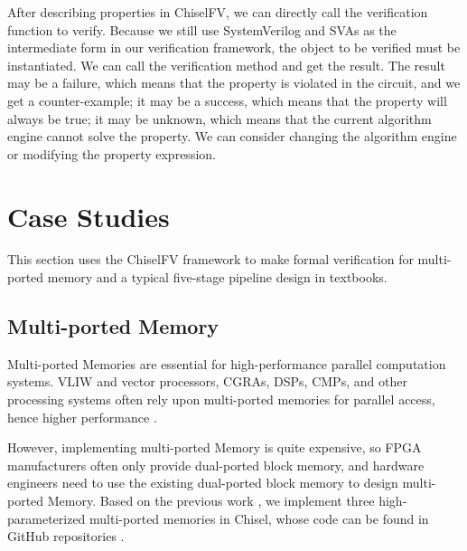 \documentclass[conference]{IEEEtran}
\theoremstyle{definition}
\begin{document}
After describing properties in ChiselFV, we can directly call the verification function to verify. Because we still use SystemVerilog and SVAs as the intermediate form in our verification framework, the object to be verified must be instantiated. 
We can call the verification method and get the result. 
The result may be a failure, which means that the property is violated in the circuit, and we get a counter-example; 
it may be a success, which means that the property will always be true; 
it may be unknown, which means that the current algorithm engine cannot solve the property. We can consider changing the algorithm engine or modifying the property expression.

\section{Case Studies}

This section uses the ChiselFV framework to make formal verification for multi-ported memory and a typical five-stage pipeline design in textbooks.

\subsection{Multi-ported Memory}

Multi-ported Memories are essential for high-performance parallel computation systems. VLIW and vector processors, CGRAs, DSPs, CMPs, and other processing systems often rely upon multi-ported memories for parallel access, hence higher performance \cite{abdelhadi2014modular}. 

However, implementing multi-ported Memory is quite expensive, so FPGA manufacturers often only provide dual-ported block memory, and hardware engineers need to use the existing dual-ported block memory to design multi-ported Memory. 
Based on the previous work \cite{xiang2022parameterized}, we implement three high-parameterized multi-ported memories in Chisel, whose code can be found in GitHub repositories \cite{mpMemory}.
\end{document}

